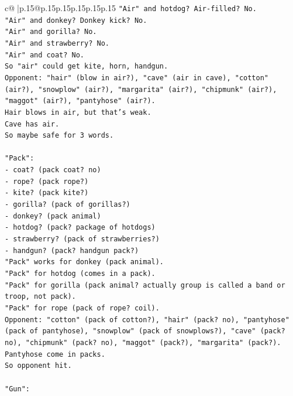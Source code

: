 \documentclass{article}
\begin{document}
{\begin{supertabular}{c@{$\;$}|p{.15\linewidth}@{}p{.15\linewidth}p{.15\linewidth}p{.15\linewidth}p{.15\linewidth}p{.15\linewidth}}
{{{\texttt{"Air" and hotdog? Air{-}filled? No.} \\
\texttt{"Air" and donkey? Donkey kick? No.} \\
\texttt{"Air" and gorilla? No.} \\
\texttt{"Air" and strawberry? No.} \\
\texttt{"Air" and coat? No.} \\
\texttt{So "air" could get kite, horn, handgun.} \\
\texttt{Opponent: "hair" (blow in air?), "cave" (air in cave), "cotton" (air?), "snowplow" (air?), "margarita" (air?), "chipmunk" (air?), "maggot" (air?), "pantyhose" (air?).} \\
\texttt{Hair blows in air, but that's weak.} \\
\texttt{Cave has air.} \\
\texttt{So maybe safe for 3 words.} \\
\\ 
\texttt{"Pack":} \\
\texttt{{-} coat? (pack coat? no)} \\
\texttt{{-} rope? (pack rope?)} \\
\texttt{{-} kite? (pack kite?)} \\
\texttt{{-} gorilla? (pack of gorillas?)} \\
\texttt{{-} donkey? (pack animal)} \\
\texttt{{-} hotdog? (pack? package of hotdogs)} \\
\texttt{{-} strawberry? (pack of strawberries?)} \\
\texttt{{-} handgun? (pack? handgun pack?)} \\
\texttt{"Pack" works for donkey (pack animal).} \\
\texttt{"Pack" for hotdog (comes in a pack).} \\
\texttt{"Pack" for gorilla (pack animal? actually group is called a band or troop, not pack).} \\
\texttt{"Pack" for rope (pack of rope? coil).} \\
\texttt{Opponent: "cotton" (pack of cotton?), "hair" (pack? no), "pantyhose" (pack of pantyhose), "snowplow" (pack of snowplows?), "cave" (pack? no), "chipmunk" (pack? no), "maggot" (pack?), "margarita" (pack?).} \\
\texttt{Pantyhose come in packs.} \\
\texttt{So opponent hit.} \\
\\ 
\texttt{"Gun":} \\
}}}
\end{supertabular}}
\end{document}
